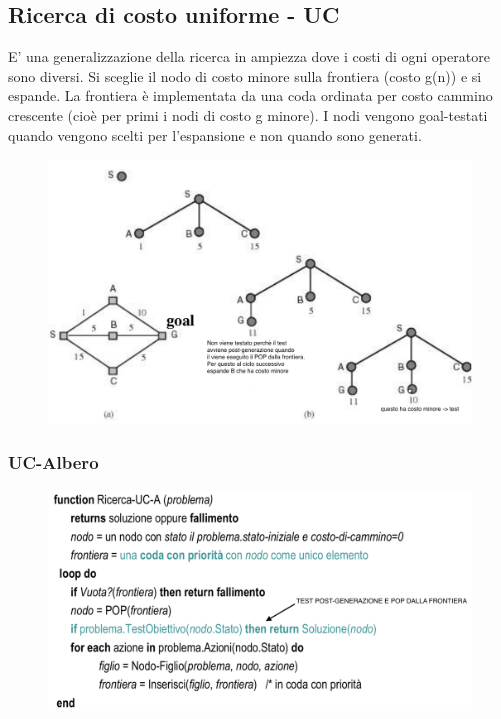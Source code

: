 \documentclass{article}
\begin{document}
\subsection{Ricerca di costo uniforme - UC}
E' una generalizzazione della ricerca in ampiezza dove i costi di ogni operatore sono diversi. Si sceglie il nodo di costo minore sulla frontiera (costo g(n)) e si espande. La frontiera è implementata da una coda ordinata per costo cammino crescente (cioè per primi i nodi di costo g minore). I nodi vengono goal-testati quando vengono scelti per l'espansione e non quando sono generati.
\begin{figure}[H]
    \centering
    \includegraphics[scale=0.8]{Images/UC.png}
\end{figure}

\subsubsection{UC-Albero}
\begin{figure}[H]
    \centering
    \includegraphics[scale=0.45]{Images/UC-A.png}
\end{figure}
\end{document}
